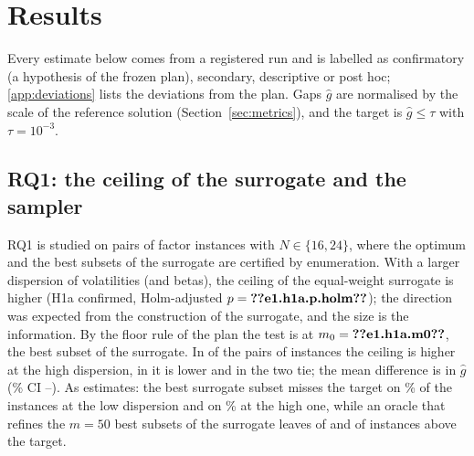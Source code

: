 \section{Results}\label{sec:results}

Every estimate below comes from a registered run and is labelled as confirmatory (a hypothesis of the frozen plan),
secondary, descriptive or post hoc; \ref{app:deviations} lists the deviations from the plan. Gaps $\hat g$ are
normalised by the scale of the reference solution (Section~\ref{sec:metrics}), and the target is $\hat g \le \tau$ with
$\tau = 10^{-3}$.

\subsection{RQ1: the ceiling of the surrogate and the sampler}\label{sec:res-rq1}

RQ1 is studied on pairs of factor instances with $N \in \{16, 24\}$, where the optimum and the best subsets of the
surrogate are certified by enumeration. With a larger dispersion of volatilities (and betas), the ceiling of the
equal-weight surrogate is higher (H1a confirmed, Holm-adjusted $p = \res{e1.h1a.p.holm}$); the direction was expected
from the construction of the surrogate, and the size is the information. By the floor rule of the plan the test is at
$m_0 = \res{e1.h1a.m0}$, the best subset of the surrogate. In  of the  pairs of
instances the ceiling is higher at the high dispersion, in  it is lower and in  the
two tie; the mean difference is  in $\hat g$ (\% CI
--). As estimates: the best surrogate subset misses the
target on \% of the instances at the low dispersion and on \% at
the high one, while an oracle that refines the $m = 50$ best subsets of the surrogate leaves
 of  and  of
 instances above the target.

